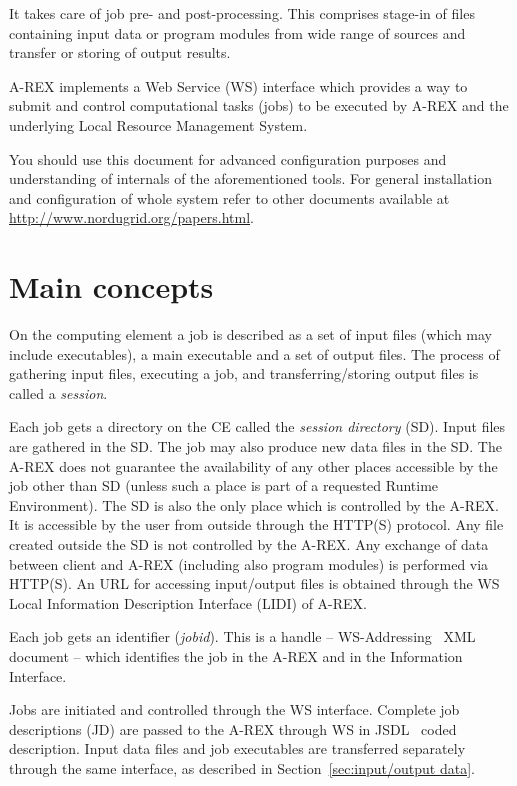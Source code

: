 \documentclass{article}                            %
\begin{document}
It takes care of job pre- and post-processing. This comprises
stage-in of files containing input data or program modules from wide
range of sources and transfer or storing of output results.

A-REX implements a Web Service (WS) interface which provides a
way to submit and control computational tasks (jobs) to be executed
by A-REX and the underlying Local Resource Management System.

\begin{framed}You should use this document for advanced configuration purposes
and understanding of internals of the aforementioned tools. For general
installation and configuration of whole system refer to other documents
available at \url{http://www.nordugrid.org/papers.html}.
\end{framed}

\section{Main concepts\label{sec:main concepts}}

On the computing element a job is described as a set of input files
(which may include executables), a main executable and a set of output
files. The process of gathering input files, executing a job, and
transferring/storing output files is called a \emph{session}.

Each job gets a directory on the CE called the \emph{session
  directory} (SD). Input files are gathered in the SD. The job may
also produce new data files in the SD. The A-REX does not guarantee
the availability of any other places accessible by the job other than
SD (unless such a place is part of a requested Runtime Environment).
The SD is also the only place which is controlled by the A-REX. It is
accessible by the user from outside through the HTTP(S) protocol.  Any
file created outside the SD is not controlled by the A-REX. Any
exchange of data between client and A-REX (including also program
modules) is performed via HTTP(S). An URL for accessing input/output
files is obtained through the WS Local Information Description
Interface (LIDI) of A-REX.

Each job gets an identifier (\textit{jobid}). This is a handle -- WS-Addressing~\cite{ws-addr-soap} XML document -- which identifies the job in the
A-REX and in the Information Interface.

Jobs are initiated and controlled through the WS interface. Complete
job descriptions (JD) are passed to the A-REX through WS in JSDL~\cite{jsdl}
coded description. Input data files and job executables are transferred
separately through the same interface, as described in Section~\ref{sec:input/output data}.
\end{document}
